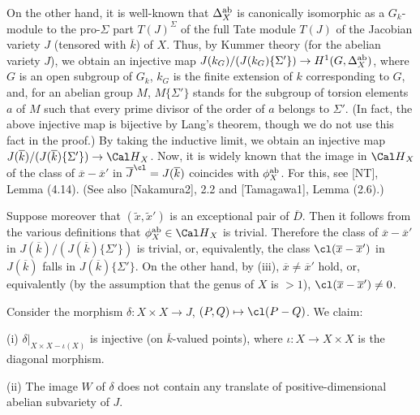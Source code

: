On the other hand, it is well-known that $\Delta_{X}^{\operatorname {ab}}$ 
is canonically isomorphic as a $G_{k}$-module to 
the pro-$\Sigma$ part $T(J)^{\Sigma}$ 
of the full Tate module $T(J)$ 
of the Jacobian variety $J$ (tensored with $\overline{k}$) 
of $X$. Thus, by Kummer theory (for the abelian variety $J$), 
we obtain an injective map 
$J(k_G)/(J(k_G)\{\Sigma'\})\to H^1(G, \Delta_{X}^{\operatorname {ab}})$, 
where $G$ is an open subgroup of $G_{k}$, $k_G$ is 
the finite extension of $k$ corresponding to $G$, 
and, for an abelian group $M$, $M\{\Sigma'\}$ stands 
for the subgroup of torsion elements $a$ of $M$ such 
that every prime divisor of the order of $a$ 
belongs to $\Sigma'$. 
(In fact, the above injective map is bijective by Lang's theorem, 
though we do not use this fact in the proof.) By taking 
the inductive limit, we obtain an injective map 
$J(\overline{k})/ (J(\overline{k})\{\Sigma'\})\to 
{\Cal H}_X$. 
Now, it is widely known that the image in ${\Cal H}_X$ 
of the class of ${\overline x}-{\overline x}'$ 
in ${\overline J}^{\cl}=J(\overline{k})$ 
coincides with $\phi_X^{\operatorname {ab}}$. For this, see [NT], Lemma (4.14). 
(See also [Nakamura2], 2.2 and [Tamagawa1], Lemma (2.6).) 

Suppose moreover that $(\tilde x,{\tilde x}')$ is an exceptional 
pair of $\overline{D}$. Then it follows from the various definitions 
that $\phi_X^{\ab}\in{\Cal H}_X$ is trivial. Therefore the class 
of ${\overline x}-{\overline x}'$ in 
$J(\overline{k})/ (J(\overline{k})\{\Sigma'\})$ 
is trivial, or, equivalently, the class 
$\cl({\overline x}-{\overline x}')$ in $J(\overline{k})$ falls 
in $J(\overline{k})\{\Sigma'\}$. On the other hand, 
by (iii), ${\overline x}\neq{\overline x}'$ hold, or, equivalently 
(by the assumption that the genus of $X$ is $>1$), 
$\cl({\overline x}-{\overline x}')\neq 0$. 

Consider the morphism $\delta: X\times X\to J$, 
$(P,Q)\mapsto\cl(P-Q)$. We claim: 

(i) $\delta|_{X\times X-\iota(X)}$ is injective 
(on $\overline{k}$-valued points), where 
$\iota :X\to X\times X$ is the diagonal morphism. 

\noindent
(ii) The image $W$ of $\delta$ does not contain any translate 
of positive-dimensional abelian subvariety of $J$. 
\enddefinition

